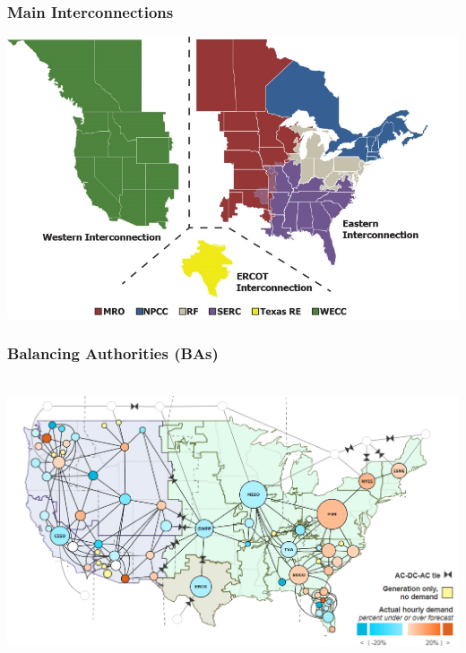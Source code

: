 \documentclass[14pt, unknownkeysallowed]{beamer}
\begin{document}
\begin{frame}
\frametitle{Main Interconnections} %
{\centering
\includegraphics[height=.85\textheight]{NERCInterconnectionsEDIT} %
}
\end{frame}
\begin{frame}
\frametitle{Balancing Authorities (BAs)}\ \vspace{.5em}
{\centering
\href{https://www.eia.gov/realtime_grid/}%
{\includegraphics[width=.95\linewidth]{BAs}} %
}
\end{frame}
\end{document}
